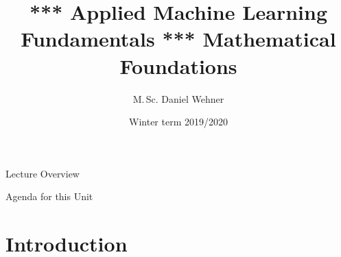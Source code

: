 


\title[Mathematical Foundations]{*** Applied Machine Learning Fundamentals *** Mathematical Foundations}
\author{M.\,Sc. Daniel Wehner}
\date{Winter term 2019/2020}




\maketitlepage


\begin{frame}{Lecture Overview}{}
\end{frame}


\begin{frame}{Agenda for this Unit}
	\begin{multicols}{2}
		\tableofcontents
	\end{multicols}
\end{frame}


\section{Introduction}

